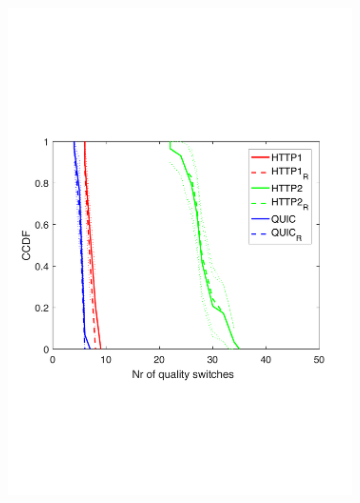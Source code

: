\begin{figure}[t!]
\begin{subfigure}[t]{0.33\textwidth}
    \includegraphics[trim={0 7cm 0 7cm}, scale=0.25]{figures/CDF_cntswitch_squad_mixed_clients_nd18.pdf}
    \caption{}
    \label{fig:pmixedcntsw}
  \end{subfigure}
  \begin{subfigure}[t]{0.33\textwidth}
  \captionsetup{justification=centering,margin=1.5cm}

\end{subfigure}
\end{figure}
